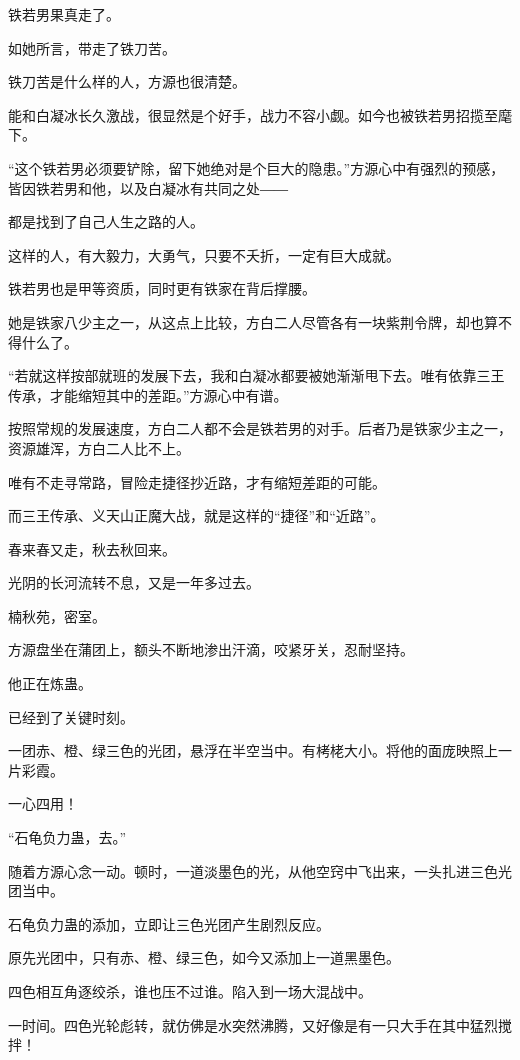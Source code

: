 
\begin{this_body}

铁若男果真走了。

如她所言，带走了铁刀苦。

铁刀苦是什么样的人，方源也很清楚。

能和白凝冰长久激战，很显然是个好手，战力不容小觑。如今也被铁若男招揽至麾下。

“这个铁若男必须要铲除，留下她绝对是个巨大的隐患。”方源心中有强烈的预感，皆因铁若男和他，以及白凝冰有共同之处――

都是找到了自己人生之路的人。

这样的人，有大毅力，大勇气，只要不夭折，一定有巨大成就。

铁若男也是甲等资质，同时更有铁家在背后撑腰。

她是铁家八少主之一，从这点上比较，方白二人尽管各有一块紫荆令牌，却也算不得什么了。

“若就这样按部就班的发展下去，我和白凝冰都要被她渐渐甩下去。唯有依靠三王传承，才能缩短其中的差距。”方源心中有谱。

按照常规的发展速度，方白二人都不会是铁若男的对手。后者乃是铁家少主之一，资源雄浑，方白二人比不上。

唯有不走寻常路，冒险走捷径抄近路，才有缩短差距的可能。

而三王传承、义天山正魔大战，就是这样的“捷径”和“近路”。

春来春又走，秋去秋回来。

光阴的长河流转不息，又是一年多过去。

楠秋苑，密室。

方源盘坐在蒲团上，额头不断地渗出汗滴，咬紧牙关，忍耐坚持。

他正在炼蛊。

已经到了关键时刻。

一团赤、橙、绿三色的光团，悬浮在半空当中。有栲栳大小。将他的面庞映照上一片彩霞。

一心四用！

“石龟负力蛊，去。”

随着方源心念一动。顿时，一道淡墨色的光，从他空窍中飞出来，一头扎进三色光团当中。

石龟负力蛊的添加，立即让三色光团产生剧烈反应。

原先光团中，只有赤、橙、绿三色，如今又添加上一道黑墨色。

四色相互角逐绞杀，谁也压不过谁。陷入到一场大混战中。

一时间。四色光轮彪转，就仿佛是水突然沸腾，又好像是有一只大手在其中猛烈搅拌！


\end{this_body}

